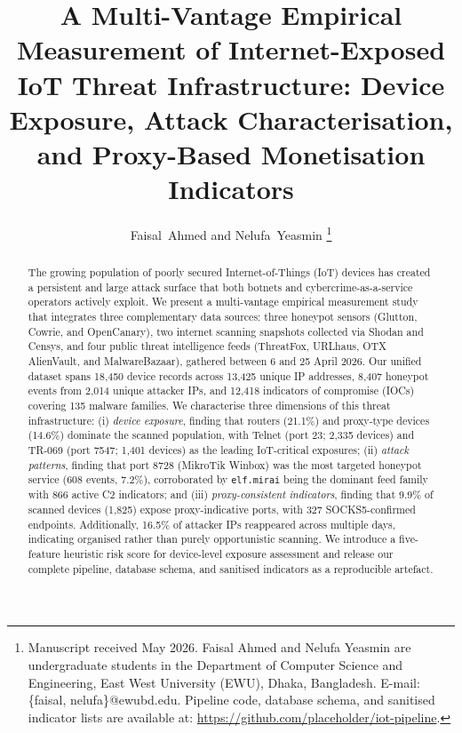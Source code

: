 \documentclass[journal]{IEEEtran}
\begin{document}
\title{A Multi-Vantage Empirical Measurement of
Internet-Exposed IoT Threat Infrastructure: Device Exposure,
Attack Characterisation, and Proxy-Based Monetisation Indicators}

\author{%
Faisal~Ahmed and Nelufa~Yeasmin%
\thanks{Manuscript received May 2026.
Faisal Ahmed and Nelufa Yeasmin are undergraduate students in the
Department of Computer Science and Engineering,
East West University (EWU), Dhaka, Bangladesh.
E-mail: \{faisal, nelufa\}@ewubd.edu.
Pipeline code, database schema, and sanitised indicator lists are
available at: \url{https://github.com/placeholder/iot-pipeline}.}%
}

\maketitle

\begin{abstract}
The growing population of poorly secured Internet-of-Things (IoT) devices has
created a persistent and large attack surface that both botnets and
cybercrime-as-a-service operators actively exploit.
We present a multi-vantage empirical measurement study that integrates three
complementary data sources: three honeypot sensors (Glutton, Cowrie, and
OpenCanary), two internet scanning snapshots collected via Shodan and Censys,
and four public threat intelligence feeds (ThreatFox, URLhaus, OTX AlienVault,
and MalwareBazaar), gathered between 6 and 25 April 2026.
Our unified dataset spans 18{,}450 device records across 13{,}425 unique IP
addresses, 8{,}407 honeypot events from 2{,}014 unique attacker IPs, and
12{,}418 indicators of compromise (IOCs) covering 135 malware families.
We characterise three dimensions of this
threat infrastructure: (i) \emph{device exposure}, finding that routers
(21.1\%) and proxy-type devices (14.6\%) dominate the scanned population,
with Telnet (port 23; 2{,}335 devices) and TR-069 (port 7547; 1{,}401 devices)
as the leading IoT-critical exposures; (ii) \emph{attack patterns}, finding
that port 8728 (MikroTik Winbox) was the most targeted honeypot service
(608 events, 7.2\%), corroborated by \texttt{elf.mirai} being the dominant
feed family with 866 active C2 indicators; and (iii)
\emph{proxy-consistent indicators}, finding that 9.9\% of scanned devices
(1{,}825) expose proxy-indicative ports, with 327 SOCKS5-confirmed endpoints.
Additionally, 16.5\% of attacker IPs reappeared across multiple days,
indicating organised rather than purely opportunistic scanning.
We introduce a five-feature heuristic risk score for device-level exposure
assessment and release our complete pipeline, database schema, and sanitised
indicators as a reproducible artefact.
\end{abstract}
\end{document}
